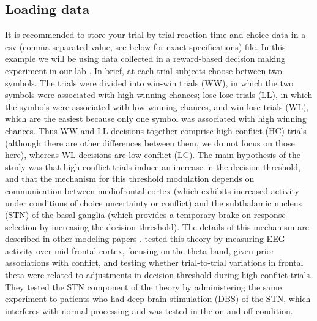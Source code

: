 \documentclass[letterpaper,10pt,english]{article}
\begin{document}
\subsection*{Loading data}
\label{demo:loading-data}
It is recommended to store your trial-by-trial reaction time and
choice data in a csv (comma-separated-value, see below for exact
specifications) file. In this example we will be using data collected
in a reward-based decision making experiment in our lab
\citep{CavanaghWieckiCohenEtAl11}. In brief, at each trial subjects
choose between two symbols. The trials were divided into win-win
trials (WW), in which the two symbols were associated with high
winning chances; lose-lose trials (LL), in which the symbols were
associated with low winning chances, and win-lose trials (WL), which
are the easiest because only one symbol was associated with high
winning chances. Thus WW and LL decisions together comprise high
conflict (HC) trials (although there are other differences between
them, we do not focus on those here), whereas WL decisions are low
conflict (LC).  The main hypothesis of the study was that high
conflict trials induce an increase in the decision threshold, and that
the mechanism for this threshold modulation depends on communication
between mediofrontal cortex (which exhibits increased activity under
conditions of choice uncertainty or conflict) and the subthalamic
nucleus (STN) of the basal ganglia (which provides a temporary brake
on response selection by increasing the decision threshold). The
details of this mechanism are described in other modeling papers
\citep[e.g.][]{RatcliffFrank12}. \citet{CavanaghWieckiCohenEtAl11}
tested this theory by measuring EEG activity over mid-frontal cortex,
focusing on the theta band, given prior associations with conflict,
and testing whether trial-to-trial variations in frontal theta were
related to adjustments in decision threshold during high conflict
trials. They tested the STN component of the theory by administering
the same experiment to patients who had deep brain stimulation (DBS)
of the STN, which interferes with normal processing and was tested in the on and off condition.
\end{document}
